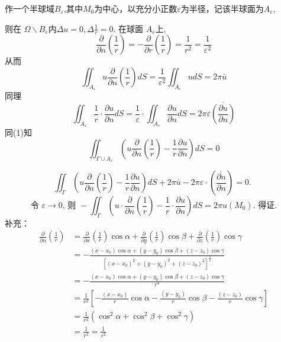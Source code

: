 \begin{questions}
\begin{solution}
作一个半球域$B_{\varepsilon}$,其中$M_0$为中心，以充分小正数$\varepsilon$为半径，记该半球面为$A_{\varepsilon}$,

则在 $ \Omega \backslash B_{\varepsilon} $内$ \Delta u=0, \Delta \frac{1}{r}=0 $.
在球面 $ A_{\varepsilon} $上, $$\frac{\partial}{\partial n}\left(\frac{1}{r}\right)=-\frac{\partial}{\partial r}\left(\frac{1}{r}\right)=\frac{1}{r^{2}}=\frac{1}{\varepsilon^{2}} $$
从而 $$ \iint_{A_{\varepsilon}} u \frac{\partial}{\partial n}\left(\frac{1}{r}\right) d S=\frac{1}{\varepsilon^{2}} \iint_{A_{\varepsilon}} u d S=2 \pi \bar{u} $$
同理 $$ \iint_{A_{\varepsilon}} \frac{1}{r} \cdot \frac{\partial u}{\partial n} d S=\frac{1}{\varepsilon} \cdot \iint_{A_{\varepsilon}} \frac{\partial u}{\partial n} d S=2 \pi \varepsilon \overline{\left(\frac{\partial u}{\partial n}\right)} $$
同(1)知 $$\iint_{\Gamma\cup  A_{\varepsilon}}\left(u \frac{\partial}{\partial n}\left(\frac{1}{r}\right)-\frac{1}{r} \frac{\partial u}{\partial n}\right) d S=0 $$

$$
\iint_{\Gamma}\left(u \frac{\partial}{\partial n}\left(\frac{1}{r}\right)-\frac{1}{r} \frac{\partial u}{\partial n}\right) d S+2 \pi \bar{u}-2 \pi \varepsilon \cdot\left(\frac{\overline{\partial n}}{\partial n}\right)=0 \text {. } 
$$
$$
\text { 令 } \varepsilon \rightarrow 0 \text {, 则 }-\iint_{\Gamma}\left(u \cdot \frac{\partial}{\partial n}(\frac 1 r)-\frac{1}{r} \cdot \frac{\partial u}{\partial n}\right) d S=2 \pi u\left(M_{0}\right) \text {. 得证. }
$$
补充：
$$ \begin{aligned} \frac{\partial}{\partial n}\left(\frac{1}{r}\right) & =\frac{\partial}{\partial x}\left(\frac{1}{r}\right) \cos \alpha+\frac{\partial}{\partial y}(\frac 1 r) \cos \beta+\frac{\partial}{\partial z}\left(\frac{1}{r}\right) \cos \gamma \\ & =-\frac{\left(x-x_{0}\right) \cos \alpha+\left(y-y_{0}\right) \cos \beta+\left(z-z_{0}\right) \cos \gamma}{\left[\left(x-x_{0}\right)^{2}+\left(y-y_{0}\right)^{2}+\left(z-z_{0}\right)^{2}\right]^{\frac{3}{2}}} \\ & =-\frac{\left(x-x_{0}\right) \cos \alpha+\left(y-y_{0}\right) \cos \beta+\left(z-z_{0}\right) \cos \gamma}{r^{3}} \\ & =\frac{1}{r^{2}}\left[-\frac{\left(x-x_{0}\right)}{r} \cos \alpha-\frac{\left(y-y_{0}\right)}{r} \cos \beta-\frac{\left(z-z_{0}\right)}{r} \cos \gamma\right] \\ & =\frac{1}{r^{2}}\left(\cos ^{2} \alpha+\cos ^{2} \beta+\cos ^{2} \gamma\right) \\ & =\frac{1}{r^{2}}=\frac{1}{\varepsilon^{2}}\end{aligned} $$
\end{solution}
\end{questions}

